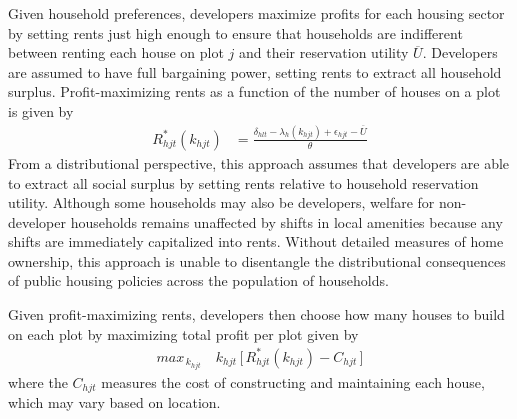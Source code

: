 \documentclass[12pt]{article}
\begin{document}
Given household preferences, developers maximize profits for each housing sector by setting rents just high enough to ensure that households are indifferent between renting each house on plot $j$ and their reservation utility $\overline{U}$.  Developers are assumed to have full bargaining power, setting rents to extract all household surplus.  Profit-maximizing rents as a function of the number of houses on a plot is given by
\begin{align}
\label{eq:rent}
R_{hjt}^{*}(k_{hjt}) &= \frac{ \delta_{hlt} - \lambda_{h}(k_{hjt}) + \epsilon_{hjt} - \overline{U}}{\theta}
\end{align}
From a distributional perspective, this approach assumes that developers are able to extract all social surplus by setting rents relative to household reservation utility.  Although some households may also be developers, welfare for non-developer households remains unaffected by shifts in local amenities because any shifts are immediately capitalized into rents.  Without detailed measures of home ownership, this approach is unable to disentangle the distributional consequences of public housing policies across the population of households.

Given profit-maximizing rents, developers then choose how many houses to build on each plot by maximizing total profit per plot given by
\begin{align*}
max_{\,k_{hjt}} \,\,\,\,\,\,  k_{hjt} \, \Big[ \, R_{hjt}^{*}(k_{hjt}) - C_{hjt} \, \Big ]
\end{align*}
\noindent where the $C_{hjt}$ measures the cost of constructing and maintaining each house, which may vary based on location.

\end{document}

